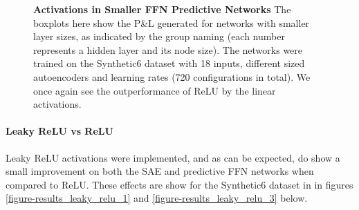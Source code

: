 \documentclass[a4paper,latin]{paper}
\begin{document}
\begin{figure}[H]
\begin{minipage}{0.45\textwidth}
	\caption{\textbf{Activations in Smaller FFN Predictive Networks}
		 \newline The boxplots here show the P\&L generated for networks with smaller layer sizes, as indicated by the group naming (each number represents a hidden layer and its node size). The networks were trained on the Synthetic6 dataset with 18 inputs, different sized autoencoders and learning rates (720 configurations in total). We once again see the outperformance of ReLU by the linear activations.}
	\label{figure-results_linear_vs_relu}
	\end{minipage}
\end{figure}


\paragraph{Leaky ReLU vs ReLU}

Leaky ReLU activations were implemented, and as can be expected, do show a small improvement on both the SAE and predictive FFN networks when compared to ReLU. These effects are show for the Synthetic6 dataset in in figures \ref{figure-results_leaky_relu_1} and \ref{figure-results_leaky_relu_3} below.
\end{document}
